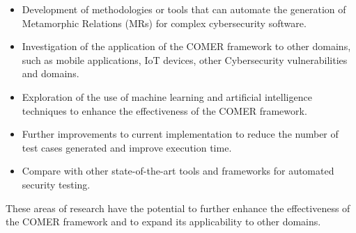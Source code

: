 \begin{itemize}
\item Development of methodologies or tools that can automate the generation of Metamorphic Relations (MRs) for complex cybersecurity software.
\item Investigation of the application of the COMER framework to other domains, such as mobile applications, IoT devices, other Cybersecurity vulnerabilities and domains.
\item Exploration of the use of machine learning and artificial intelligence techniques to enhance the effectiveness of the COMER framework.
\item Further improvements to current implementation to reduce the number of test cases generated and improve execution time.
\item Compare with other state-of-the-art tools and frameworks for automated security testing.
\end{itemize}

These areas of research have the potential to further enhance the effectiveness of the COMER framework and to expand its applicability to other domains.
